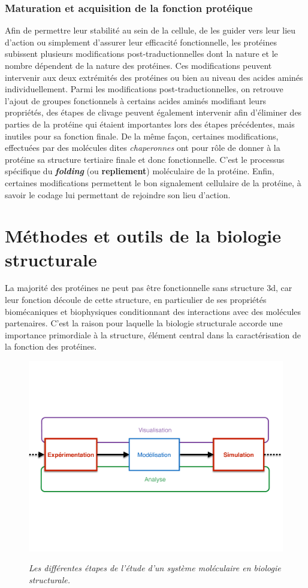 \subsubsection{Maturation et acquisition de la fonction protéique}

Afin de permettre leur stabilité au sein de la cellule, de les guider vers leur lieu d'action ou simplement d'assurer leur efficacité fonctionnelle, les protéines subissent plusieurs modifications post-traductionnelles dont la nature et le nombre dépendent de la nature des protéines. Ces modifications peuvent intervenir aux deux extrémités des protéines ou bien au niveau des acides aminés individuellement. Parmi les modifications post-traductionnelles, on retrouve l'ajout de groupes fonctionnels à certains acides aminés modifiant leurs propriétés, des étapes de clivage peuvent également intervenir afin d'éliminer des parties de la protéine qui étaient importantes lors des étapes précédentes, mais inutiles pour sa fonction finale. De la même façon, certaines modifications, effectuées par des molécules dites \textit{chaperonnes} ont pour rôle de donner à la protéine sa structure tertiaire finale et donc fonctionnelle. C'est le processus spécifique du \textbf{\textit{folding}} (ou \textbf{repliement}) moléculaire de la protéine. Enfin, certaines modifications permettent le bon signalement cellulaire de la protéine, à savoir le codage lui permettant de rejoindre son lieu d'action.

\section{Méthodes et outils de la biologie structurale}

La majorité des protéines ne peut pas être fonctionnelle sans structure 3d, car leur fonction découle de cette structure, en particulier de ses propriétés biomécaniques et biophysiques conditionnant des interactions avec des molécules partenaires. C'est la raison pour laquelle la biologie structurale accorde une importance primordiale à la structure, élément central dans la caractérisation de la fonction des protéines.

\begin{figure}[h]
  \centering
  {\includegraphics[width=.75\linewidth]{./figures/ch1/process_bio_struct_XP}}
    \caption{{\it Les différentes étapes de l'étude d'un système moléculaire en biologie structurale.}}
  \label{Fig:schema_seq_bio_struct_XP}
  \hspace{0.2cm}
\end{figure}

